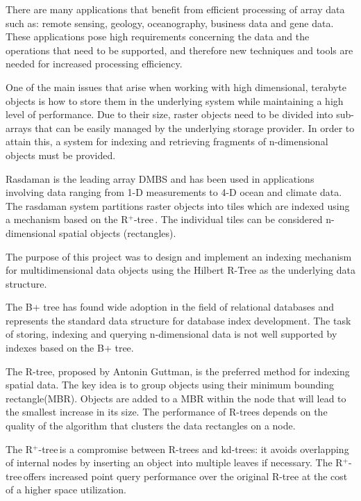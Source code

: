 \documentclass[11pt, a4paper, oneside]{article}
\newcommand{\rplus}{R$^+$-tree$\,$}
\begin{document}
There are many applications that benefit from efficient processing of array data such as: remote sensing, geology, oceanography, business data and gene data. These applications pose high requirements concerning the data and the operations that need to be supported, and therefore new techniques and tools are needed for increased processing efficiency.

One of the main issues that arise when working with high dimensional, terabyte objects is how to store them in the underlying system while maintaining a high level of performance. Due to their size, raster objects need to be divided into sub-arrays that can be easily managed by the underlying storage provider. In order to attain this, a system for indexing and retrieving fragments of n-dimensional objects must be provided.

Rasdaman is the leading array DMBS and has been used in applications involving data ranging from 1-D measurements to 4-D ocean and climate data. The rasdaman system partitions raster objects into tiles\cite{DBLP:conf/icde/FurtadoB99} which are indexed using a mechanism based on the \rplus. The individual tiles can be considered n-dimensional spatial objects (rectangles). 

The purpose of this project was to design and implement an indexing mechanism for multidimensional data objects using the Hilbert R-Tree as the underlying data structure.

The B+ tree\cite{Comer:1979:UB:356770.356776} has found wide adoption in the field of relational databases and represents the standard data structure for database index development. The task of storing, indexing and querying n-dimensional data is not well supported by indexes based on the B+ tree. 

The R-tree, proposed by Antonin Guttman\cite{Guttman:1984:RDI:602259.602266}, is the preferred method for indexing spatial data. The key idea is to group objects using their minimum bounding rectangle(MBR). Objects are added to a MBR within the node that will lead to the smallest increase in its size. The performance of R-trees depends on the quality of the algorithm that clusters the data rectangles on a node.

The \rplus is a compromise between R-trees and kd-trees: it avoids overlapping of internal nodes by inserting an object into multiple leaves if necessary. The \rplus offers increased point query performance over the original R-tree at the cost of a higher space utilization. 
\end{document}
